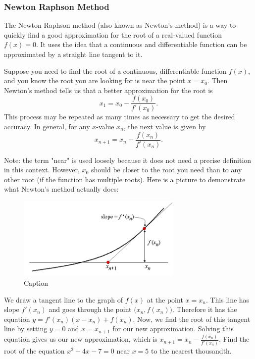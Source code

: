 \documentclass{article}
\begin{document}
\subsubsection{Newton Raphson Method}
The Newton-Raphson method (also known as Newton's method) is a way to quickly find a good approximation for the root of a real-valued function \(f(x) = 0\). It uses the idea that a continuous and differentiable function can be approximated by a straight line tangent to it.

Suppose you need to find the root of a continuous, differentiable function \(f(x)\), and you know the root you are looking for is near the point \(x = x_0\). Then Newton's method tells us that a better approximation for the root is \[x_1 = x_0 - \frac{f(x_0)}{f'(x_0)}.\] This process may be repeated as many times as necessary to get the desired accuracy. In general, for any \(x\)-value \(x_n\), the next value is given by \[x_{n+1} = x_n - \frac{f(x_n)}{f'(x_n)}.\]

Note: the term "near" is used loosely because it does not need a precise definition in this context. However, \(x_0\) should be closer to the root you need than to any other root (if the function has multiple roots).\newline
Here is a picture to demonstrate what Newton's method actually does:\newline
\begin{center}
    \begin{figure}[h!]
        \centering
        \includegraphics[width=8cm]{7KrMvNiT7l-newtons-method.png}
        \caption{Caption}
        \label{fig:enter-label}
    \end{figure}
\end{center}
We draw a tangent line to the graph of \(f(x)\) at the point \(x = x_n\). This line has slope \(f'(x_n)\) and goes through the point \(\big(x_n, f(x_n)\big)\). Therefore it has the equation \(y = f'(x_n)(x - x_n) + f(x_n)\). Now, we find the root of this tangent line by setting \(y = 0\) and \(x=x_{n+1}\) for our new approximation. Solving this equation gives us our new approximation, which is \(x_{n+1} = x_n - \frac{f(x_n)}{f'(x_n)}\).
\newline
Find the root of the equation \(x^2 - 4x - 7 = 0\) near \(x = 5\) to the nearest thousandth.
\end{document}
